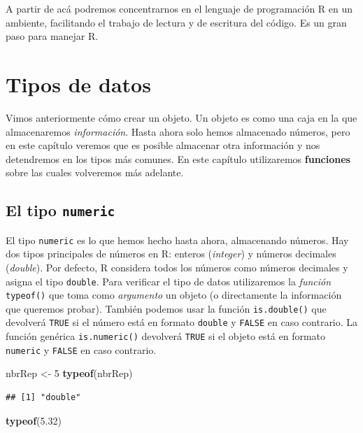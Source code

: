 \documentclass[]{book}
\newenvironment{Shaded}{\begin{snugshade}}{\end{snugshade}}
\newcommand{\KeywordTok}[1]{\textcolor[rgb]{0.13,0.29,0.53}{\textbf{#1}}}
\newcommand{\DecValTok}[1]{\textcolor[rgb]{0.00,0.00,0.81}{#1}}
\newcommand{\FloatTok}[1]{\textcolor[rgb]{0.00,0.00,0.81}{#1}}
\newcommand{\StringTok}[1]{\textcolor[rgb]{0.31,0.60,0.02}{#1}}
\newcommand{\NormalTok}[1]{#1}
\begin{document}
A partir de acá podremos concentrarnos en el lenguaje de programación R
en un ambiente, facilitando el trabajo de lectura y de escritura del
código. Es un gran paso para manejar R.

\chapter{Tipos de datos}\label{dataType1}

Vimos anteriormente cómo crear un objeto. Un objeto es como una caja en
la que almacenaremos \emph{información}. Hasta ahora solo hemos
almacenado números, pero en este capítulo veremos que es posible
almacenar otra información y nos detendremos en los tipos más comunes.
En este capítulo utilizaremos \textbf{funciones} sobre las cuales
volveremos más adelante.

\section{\texorpdfstring{El tipo
\texttt{numeric}}{El tipo numeric}}\label{el-tipo-numeric}

El tipo \texttt{numeric} es lo que hemos hecho hasta ahora, almacenando
números. Hay dos tipos principales de números en R: enteros
(\emph{integer}) y números decimales (\emph{double}). Por defecto, R
considera todos los números como números decimales y asigna el tipo
\texttt{double}. Para verificar el tipo de datos utilizaremos la
\emph{función} \texttt{typeof()} que toma como \emph{argumento} un
objeto (o directamente la información que queremos probar). También
podemos usar la función \texttt{is.double()} que devolverá \texttt{TRUE}
si el número está en formato \texttt{double} y \texttt{FALSE} en caso
contrario. La función genérica \texttt{is.numeric()} devolverá
\texttt{TRUE} si el objeto está en formato \texttt{numeric} y
\texttt{FALSE} en caso contrario.

\begin{Shaded}
\begin{Highlighting}[]
\NormalTok{nbrRep <-}\StringTok{ }\DecValTok{5}
\KeywordTok{typeof}\NormalTok{(nbrRep)}
\end{Highlighting}
\end{Shaded}

\begin{verbatim}
## [1] "double"
\end{verbatim}

\begin{Shaded}
\begin{Highlighting}[]
\KeywordTok{typeof}\NormalTok{(}\FloatTok{5.32}\NormalTok{)}
\end{Highlighting}
\end{Shaded}
\end{document}
